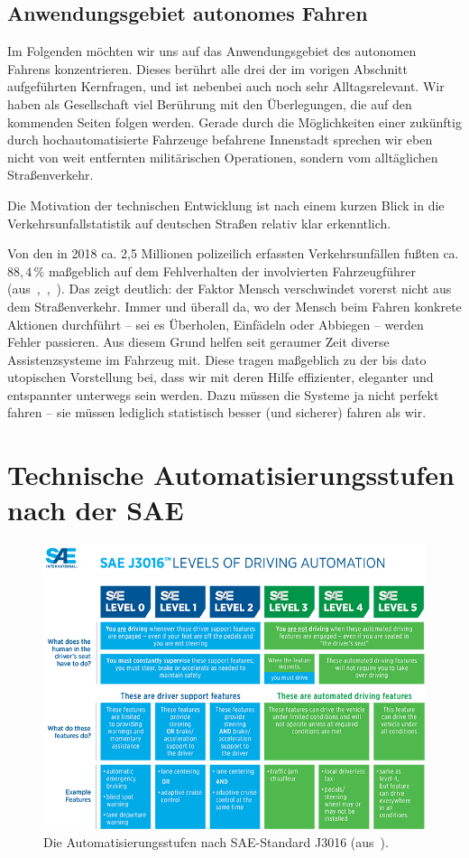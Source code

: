 \documentclass[twocolumn, german]{tum-article}
\begin{document}
\subsection{Anwendungsgebiet autonomes Fahren}
Im Folgenden möchten wir uns auf das Anwendungsgebiet des autonomen Fahrens konzentrieren.
Dieses berührt alle drei der im vorigen Abschnitt aufgeführten Kernfragen, und ist nebenbei auch noch sehr Alltagsrelevant.
Wir haben als Gesellschaft viel Berührung mit den Überlegungen, die auf den kommenden Seiten folgen werden.
Gerade durch die Möglichkeiten einer zukünftig durch hochautomatisierte Fahrzeuge befahrene Innenstadt sprechen wir eben nicht von weit entfernten militärischen Operationen, sondern vom alltäglichen Straßenverkehr.

Die Motivation der technischen Entwicklung ist nach einem kurzen Blick in die Verkehrsunfallstatistik auf deutschen Straßen relativ klar erkenntlich.

Von den in 2018 ca. 2,5 Millionen polizeilich erfassten Verkehrsunfällen fußten ca. $88,4 \,\%$ maßgeblich auf dem Fehlverhalten der involvierten Fahrzeugführer (aus~\cite{kba-zulass},~\cite{destatis-grafik},~\cite{destatis-unfallaktuell}).
Das zeigt deutlich: der Faktor Mensch verschwindet vorerst nicht aus dem Straßenverkehr.
Immer und überall da, wo der Mensch beim Fahren konkrete Aktionen durchführt -- sei es Überholen, Einfädeln oder Abbiegen -- werden Fehler passieren.
Aus diesem Grund helfen seit geraumer Zeit diverse Assistenzsysteme im Fahrzeug mit.
Diese tragen maßgeblich zu der bis dato utopischen Vorstellung bei, dass wir mit deren Hilfe effizienter, eleganter und entspannter unterwegs sein werden.
Dazu müssen die Systeme ja nicht perfekt fahren -- sie müssen lediglich statistisch besser (und sicherer) fahren als wir.


\section{Technische Automatisierungsstufen nach der SAE}
\begin{figure}
	\includegraphics[width=\textwidth]{media/sae-levels-image}
	\caption{Die Automatisierungsstufen nach SAE-Standard J3016 (aus~\cite{sae-levels-image}).}
	\label{fig:sae-levels-img}
\end{figure}
\end{document}

